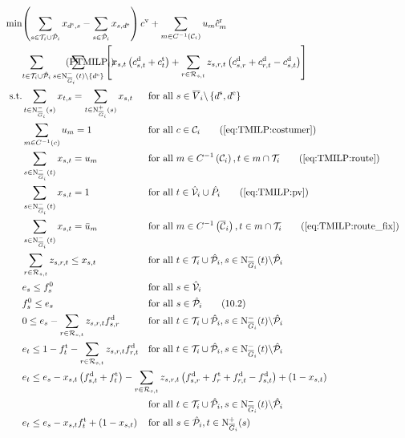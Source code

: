 \begin{align}
\label{eq:PTMILP}
	\min & \omit\rlap{$\displaystyle{\left(\sum_{s\in\Ti\cup\Phat_i} x_{\ds,s} - \sum_{s\in\Phat_i} x_{s,\de}\right) \cv + \sum_{m\in C^{-1}\left(\mathcal{C}_i\right)} u_m \hat{c}^{\operatorname{r}}_m}$} \nonumber \\
	& \omit\rlap{$\displaystyle{\sum_{t\in\Ti\cup\Phat_i}\sum_{s\in\Ninoi(t)\backslash\left\{\de\right\}}\left[x_{s,t}\left(\cd_{s,t}+\ct_t\right)+\sum_{r\in\Rst}z_{s,r,t}\left(\cd_{s,r}+\cd_{r,t}-\cd_{s,t}\right)\right]}$} \tag{$\operatorname{PTMILP}_i$} \\
	\text{s.t.} & \sum_{t\in\Ninoi(s)} x_{t,s} = \sum_{t\in\Noutoi(s)} x_{s,t} & & \text{for all } s\in \overline{V}_i\backslash\left\{\ds,\de\right\} \\
	&\sum_{m\in C^{-1}(c)} u_m = 1 && \text{for all } c\in\mathcal{C}_i \tag{\ref{eq:TMILP:costumer}} \\
	&\sum_{s\in\Ninoi(t)} x_{s,t} = u_m && \text{for all } m\in C^{-1}\left(\mathcal{C}_i\right), t\in m\cap\Ti \tag{\ref{eq:TMILP:route}} \\
	&\sum_{s\in\Ninoi(t)} x_{s,t} = 1 && \text{for all } t\in\hat{\mathcal{V}}_i\cup\hat{P}_i \tag{\ref{eq:TMILP:pv}} \\
	&\sum_{s\in\Ninoi(t)} x_{s,t} = \bar{u}_m && \text{for all } m\in C^{-1}\left(\overline{\mathcal{C}}_i\right), t\in m\cap\Ti \tag{\ref{eq:TMILP:route_fix}} \\
	& \sum_{r\in\Rst} z_{s,r,t} \leq x_{s,t} & & \text{for all } t\in\Ti\cup\Phat_i, s\in\Ninoi(t)\backslash\Phat_i \\
	& e_s \leq f_s^0 & & \text{for all } s\in\Vhat_i \\
	& f^0_s \leq e_s && \text{for all } s\in\Phat_i \tag{10.2} \\
	& 0 \leq e_s - \sum_{r\in\Rst} z_{s,r,t}\fd_{s,r} & & \text{for all } t\in\Ti\cup\Phat_i, s\in\Ninoi(t)\backslash\Phat_i \\
	& e_t \leq 1 - \ft_t - \sum_{r\in\Rst} z_{s,r,t}\fd_{r,t} & & \text{for all } t\in\Ti\cup\Phat_i, s\in\Ninoi(t)\backslash\Phat_i \\
	& \omit\rlap{$\displaystyle{e_t \leq e_s - x_{s,t}\left(f_{s,t}^{\operatorname{d}}+f_t^{\operatorname{t}}\right) - \sum_{r\in\Rst} z_{s,r,t}\left(\fd_{s,r}+\ft_r+\fd_{r,t}-\fd_{s,t}\right) + \left(1-x_{s,t}\right)}$} \nonumber \\
	& & & \text{for all } t\in\Ti\cup\Phat_i, s\in\Ninoi(t)\backslash\Phat_i \\
	& e_t \leq e_s-x_{s,t}\ft_t+\left(1-x_{s,t}\right) && \text{for all } s\in\Phat_i,t\in\Noutoi(s) \\

\end{align}
